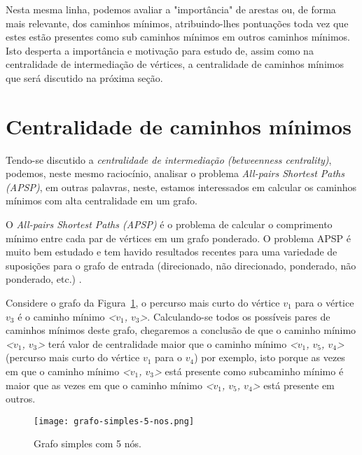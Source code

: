 Nesta mesma linha, podemos avaliar a "importância" de arestas ou, de forma mais relevante, dos caminhos mínimos, atribuindo-lhes pontuações toda vez que estes estão presentes como sub caminhos mínimos em outros caminhos mínimos. Isto desperta a importância e motivação para estudo de, assim como na centralidade de intermediação de vértices, a centralidade de caminhos mínimos que será discutido na próxima seção.


\section{Centralidade de caminhos mínimos}
Tendo-se discutido a \emph{centralidade de intermediação (betweenness centrality)}, podemos, neste mesmo raciocínio, analisar o problema \emph{All-pairs Shortest Paths (APSP)}, em outras palavras, neste, estamos interessados em calcular os caminhos mínimos com alta centralidade em um grafo.

O \emph{All-pairs Shortest Paths (APSP)} é o problema de calcular o comprimento mínimo entre cada par de vértices em um grafo ponderado. O problema APSP é muito bem estudado e tem havido resultados recentes para uma variedade de suposições para o grafo de entrada (direcionado, não direcionado, ponderado, não ponderado, etc.) \cite{alane2021}.

Considere o grafo da Figura~\ref{sec3:grafo-simples-5-nos}, o percurso mais curto do vértice $v_1$ para o vértice $v_3$ é o caminho mínimo \emph{<$v_1$, $v_3$>}. Calculando-se todos os possíveis pares de caminhos mínimos deste grafo, chegaremos a conclusão de que o caminho mínimo \emph{<$v_1$, $v_3$>} terá valor de centralidade maior que o caminho mínimo \emph{<$v_1$, $v_5$, $v_4$>} (percurso mais curto do vértice $v_1$ para o $v_4$) por exemplo, isto porque as vezes em que o caminho mínimo \emph{<$v_1$, $v_3$>} está presente como subcaminho mínimo é maior que as vezes em que o caminho mínimo \emph{<$v_1$, $v_5$, $v_4$>} está presente em outros.

\begin{figure}[!htb]
    \centering
	\texttt{[image: grafo-simples-5-nos.png]}
    \caption{Grafo simples com 5 nós.}
    \label{sec3:grafo-simples-5-nos}
\end{figure}

